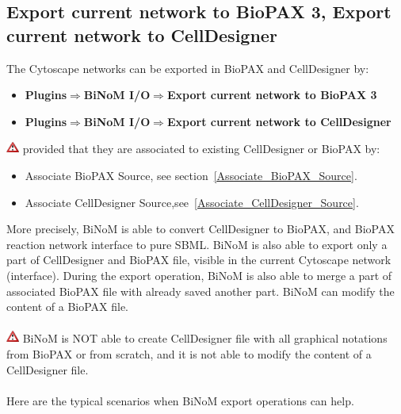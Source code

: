 \subsection{Export current network to BioPAX 3, Export current network to CellDesigner} \label{Export_current_network}
The Cytoscape networks can be exported in BioPAX and CellDesigner by:
\begin{itemize}
\item \textbf{Plugins$\Rightarrow$BiNoM I/O$\Rightarrow$Export current network to BioPAX 3}
\item \textbf{Plugins$\Rightarrow$BiNoM I/O$\Rightarrow$Export current network to CellDesigner}
\end{itemize}
\includegraphics[width=12pt,height=12pt]{graphics/warning} provided that they are associated to existing CellDesigner or BioPAX by:
\begin{itemize}
\item Associate BioPAX Source, see section~\ref{Associate_BioPAX_Source}.
\item Associate CellDesigner Source,see~\ref{Associate_CellDesigner_Source}.
\end{itemize}
More precisely, BiNoM is able to convert CellDesigner to BioPAX, and BioPAX reaction network interface to pure SBML. BiNoM is also able to export only a part of CellDesigner and BioPAX file, visible in the current Cytoscape network (interface). During the export operation, BiNoM is also able to merge a part of associated BioPAX file with already saved another part. BiNoM can modify the content of a BioPAX file. \\\\
\includegraphics[width=12pt,height=12pt]{graphics/warning} BiNoM is NOT able to create CellDesigner file with all graphical notations from BioPAX or from scratch, and it is not able to modify the content of a CellDesigner file.\\\\
Here are the typical scenarios when BiNoM export operations can help.
